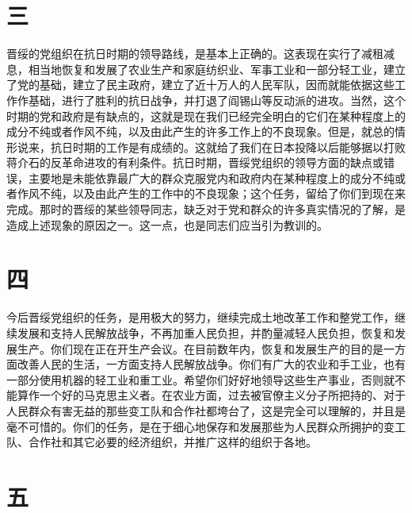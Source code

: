 \section*{三}

晋绥的党组织在抗日时期的领导路线，是基本上正确的。这表现在实行了减租减息，相当地恢复和发展了农业生产和家庭纺织业、军事工业和一部分轻工业，建立了党的基础，建立了民主政府，建立了近十万人的人民军队，因而就能依据这些工作作基础，进行了胜利的抗日战争，并打退了阎锡山等反动派的进攻。当然，这个时期的党和政府是有缺点的，这就是现在我们已经完全明白的它们在某种程度上的成分不纯或者作风不纯，以及由此产生的许多工作上的不良现象。但是，就总的情形说来，抗日时期的工作是有成绩的。这就给了我们在日本投降以后能够据以打败蒋介石的反革命进攻的有利条件。抗日时期，晋绥党组织的领导方面的缺点或错误，主要地是未能依靠最广大的群众克服党内和政府内在某种程度上的成分不纯或者作风不纯，以及由此产生的工作中的不良现象；这个任务，留给了你们到现在来完成。那时的晋绥的某些领导同志，缺乏对于党和群众的许多真实情况的了解，是造成上述现象的原因之一。这一点，也是同志们应当引为教训的。

\section*{四}

今后晋绥党组织的任务，是用极大的努力，继续完成土地改革工作和整党工作，继续发展和支持人民解放战争，不再加重人民负担，并酌量减轻人民负担，恢复和发展生产。你们现在正在开生产会议。在目前数年内，恢复和发展生产的目的是一方面改善人民的生活，一方面支持人民解放战争。你们有广大的农业和手工业，也有一部分使用机器的轻工业和重工业。希望你们好好地领导这些生产事业，否则就不能算作一个好的马克思主义者。在农业方面，过去被官僚主义分子所把持的、对于人民群众有害无益的那些变工队和合作社都垮台了，这是完全可以理解的，并且是毫不可惜的。你们的任务，是在于细心地保存和发展那些为人民群众所拥护的变工队、合作社和其它必要的经济组织，并推广这样的组织于各地。

\section*{五}


